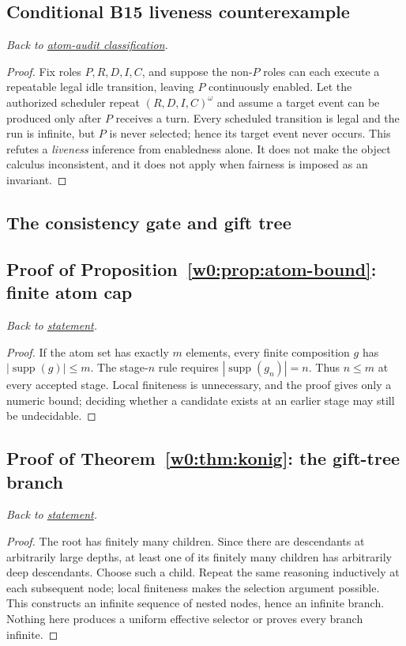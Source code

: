 \documentclass[11pt,letterpaper]{article}
\theoremstyle{definition}\newtheorem{definition}[theorem]{Definition}\newtheorem{example}[theorem]{Example}
\theoremstyle{remark}\newtheorem{remark}[theorem]{Remark}
\begin{document}
\subsection{Conditional B15 liveness counterexample}\label{w0:pr:starvation}
\textit{Back to \hyperref[w0:sec:atom-audit]{atom-audit classification}.}
\begin{proof}
Fix roles $P,R,D,I,C$, and suppose the non-$P$ roles can each execute a repeatable legal idle transition, leaving $P$ continuously enabled. Let the authorized scheduler repeat $(R,D,I,C)^\omega$ and assume a target event can be produced only after $P$ receives a turn. Every scheduled transition is legal and the run is infinite, but $P$ is never selected; hence its target event never occurs. This refutes a \emph{liveness} inference from enabledness alone. It does not make the object calculus inconsistent, and it does not apply when fairness is imposed as an invariant.
\end{proof}


\subsection*{The consistency gate and gift tree}

\subsection{Proof of Proposition~\ref{w0:prop:atom-bound}: finite atom cap}\label{w0:pr:atom-bound}
\textit{Back to \hyperref[w0:prop:atom-bound]{statement}.}
\begin{proof}
If the atom set has exactly $m$ elements, every finite composition $g$ has $|\operatorname{supp}(g)|\le m$. The stage-$n$ rule requires $|\operatorname{supp}(g_n)|=n$. Thus $n\le m$ at every accepted stage. Local finiteness is unnecessary, and the proof gives only a numeric bound; deciding whether a candidate exists at an earlier stage may still be undecidable.
\end{proof}

\subsection{Proof of Theorem~\ref{w0:thm:konig}: the gift-tree branch}\label{w0:pr:konig}
\textit{Back to \hyperref[w0:thm:konig]{statement}.}
\begin{proof}
The root has finitely many children. Since there are descendants at arbitrarily large depths, at least one of its finitely many children has arbitrarily deep descendants. Choose such a child. Repeat the same reasoning inductively at each subsequent node; local finiteness makes the selection argument possible. This constructs an infinite sequence of nested nodes, hence an infinite branch. Nothing here produces a uniform effective selector or proves every branch infinite.
\end{proof}
\end{document}
